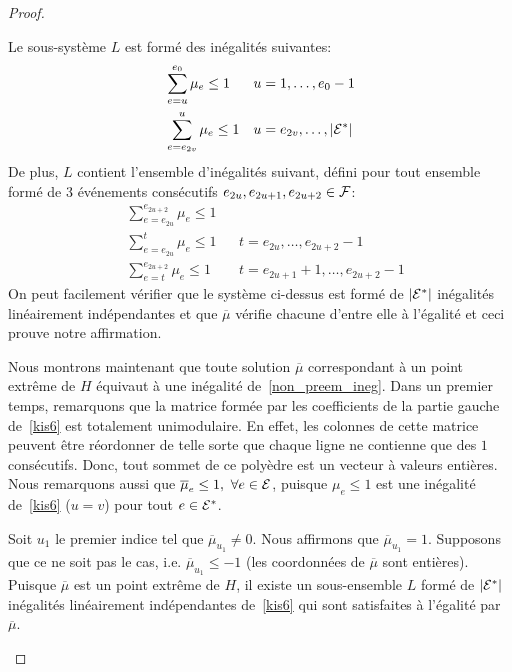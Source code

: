 \begin{proof}
\begin{itemize}
  Le sous-système $L$ est formé des inégalités suivantes: 
  \begin{align*}
    & \sum_{e=u}^{e_0} \mu_e \le 1 & & u=1,\dots, e_0-1\\
    & \sum_{e=e_{2v}}^u \mu_e \le 1& & u=e_{2v},\dots,|{\cal E}^*|
  \end{align*}
  De plus, $L$ contient l'ensemble d'inégalités suivant, défini pour
  tout ensemble formé de 3 événements consécutifs
  $e_{2u},e_{2u+1},e_{2u+2} \in \cal F$:   
  \begin{align*}
    & \sum_{e=e_{2u}}^{e_{2u+2}} \mu_e \le 1 & & \\
    & \sum_{e=e_{2u}}^t \mu_e \le 1& & t=e_{2u},\dots,e_{2u+2}-1\\
    & \sum_{e=t}^{e_{2u+2}} \mu_e \le 1& & t=e_{2u+1}+1,\dots,e_{2u+2}-1
  \end{align*} 
  On peut facilement vérifier que le système ci-dessus est formé de
  $|{\cal E}^*|$ inégalités linéairement indépendantes et que
  $\overline{\mu}$ vérifie chacune d'entre elle à l'égalité et ceci
  prouve notre affirmation. 

  Nous montrons maintenant que toute solution $\overline{\mu}$
  correspondant à un point extrême de $H$ équivaut à une inégalité
  de~\eqref{non_preem_ineg}. Dans un premier temps, remarquons que la
  matrice formée par les coefficients de la partie gauche
  de~\eqref{kis6} est totalement unimodulaire. En effet, les colonnes
  de cette matrice peuvent être réordonner de telle sorte que chaque
  ligne ne contienne que des $1$ consécutifs. Donc, tout sommet de
  ce polyèdre est un vecteur à valeurs entières. Nous remarquons aussi
  que $\overline{\mu}_e\le 1,\ \forall e \in {\cal E}$, puisque $\mu_e \le 1$
  est une inégalité de~\eqref{kis6} ($u=v$) pour tout $e \in {\cal E}^*$.
  
  Soit $u_1$ le premier indice tel que $\overline{\mu}_{u_1} \neq 0$. Nous
  affirmons que $\overline{\mu}_{u_1}=1$. Supposons que ce ne soit pas
  le cas, i.e. $\overline{\mu}_{u_1} \le -1$ (les coordonnées de
  $\overline{\mu}$ sont entières). Puisque $\overline{\mu}$ est un point
  extrême de $H$, il existe un sous-ensemble $L$ formé de $|{\cal E}^*|$
  inégalités linéairement indépendantes de~\eqref{kis6} qui sont
  satisfaites à l'égalité par $\overline{\mu}$. 


\end{itemize}
\end{proof}
